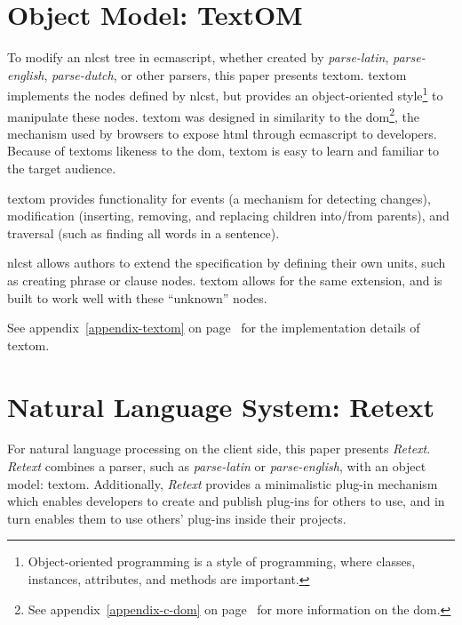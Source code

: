 \section{Object Model: TextOM}\label{object-model}

To modify an \gls{nlcst} tree in \gls{ecmascript}, whether created by
  \emph{parse-latin}, \emph{parse-english}, \emph{parse-dutch}, or other
  parsers, this paper presents \gls{textom}.
\gls{textom} implements the nodes defined by \gls{nlcst},
  but provides an object-oriented style\footnote{Object-oriented
    programming is a style of programming, where classes, instances,
    attributes, and methods are important.} to manipulate these nodes.
\gls{textom} was designed in similarity to the \gls{dom}\footnote{See
    appendix~\ref{appendix-c-dom} on page~\pageref{appendix-c-dom} for more
    information on the \gls{dom}.},
  the mechanism used by browsers to expose \gls{html} through
  \gls{ecmascript} to developers.
Because of \glspl{textom} likeness to the \gls{dom}, \gls{textom} is
  easy to learn and familiar to the target audience.

\gls{textom} provides functionality for events (a mechanism for detecting
  changes), modification (inserting, removing, and replacing children
  into\slash from parents), and traversal (such as finding all words in a
  sentence).

\gls{nlcst} allows authors to extend the specification by defining their
  own units, such as creating phrase or clause nodes.
\gls{textom} allows for the same extension, and is built to work well
  with these ``unknown'' nodes.

\medskip \noindent See appendix~\ref{appendix-textom} on
  page~\pageref{appendix-textom} for the implementation details of
  \gls{textom}.

\section{Natural Language System:
  Retext}\label{natural-language-system-retext}

For natural language processing on the client side, this paper presents
  \emph{Retext}.
\emph{Retext} combines a parser, such as \emph{parse-latin} or
  \emph{parse-english}, with an object model: \gls{textom}.
Additionally, \emph{Retext} provides a minimalistic plug-in mechanism which
  enables developers to create and publish plug-ins for others to use, and in
  turn enables them to use others' plug-ins inside their projects.

